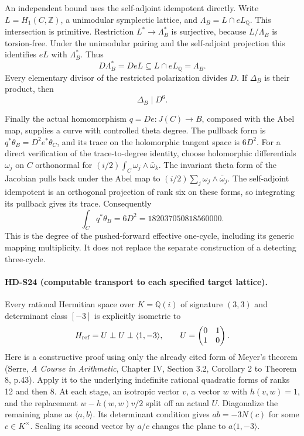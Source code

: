 An independent bound uses the self-adjoint idempotent directly. Write
\(L=H_1(C,\mathbb Z)\), a unimodular symplectic lattice, and
\(\Lambda_B=L\cap eL_{\mathbb Q}\). This intersection is primitive.
Restriction \(L^*\to\Lambda_B^*\) is surjective, because
\(L/\Lambda_B\) is torsion-free. Under the unimodular pairing and
the self-adjoint projection this identifies \(eL\) with
\(\Lambda_B^*\). Thus
\[
 D\Lambda_B^*=DeL\subseteq L\cap eL_{\mathbb Q}=\Lambda_B.
\]
Every elementary divisor of the restricted polarization divides \(D\).
If \(\Delta_B\) is their product, then
\begin{equation}\label{eq:e8-source-product-bound}
 \Delta_B\mid D^6.
\end{equation}

Finally the actual homomorphism \(q=De:J(C)\to B\), composed with
the Abel map, supplies a curve with controlled theta degree.
The pullback form is \(q^*\theta_B=D^2e^*\theta_C\), and its trace
on the holomorphic tangent space is \(6D^2\).
For a direct verification of the trace-to-degree identity, choose
holomorphic differentials \(\omega_j\) on \(C\) orthonormal for
\((i/2)\int_C\omega_j\wedge\bar\omega_k\). The invariant theta
form of the Jacobian pulls back under the Abel map to
\((i/2)\sum_j\omega_j\wedge\bar\omega_j\). The self-adjoint
idempotent is an orthogonal projection of rank six on these forms,
so integrating its pullback gives its trace. Consequently
\begin{equation}\label{eq:e8-abel-degree}
 \int_C q^*\theta_B=6D^2=182037050818560000.
\end{equation}
This is the degree of the pushed-forward effective one-cycle, including
its generic mapping multiplicity. It does not replace the separate
construction of a detecting three-cycle.

\paragraph{HD-S24 (computable transport to each specified target lattice).}
Every rational Hermitian space over \(K=\mathbb Q(i)\) of signature
\((3,3)\) and determinant class \([-3]\) is explicitly isometric to
\[
 H_{\rm ref}=U\perp U\perp\langle1,-3\rangle,
 \qquad U=\begin{pmatrix}0&1\\1&0\end{pmatrix}.
\]
Here is a constructive proof using only the already cited form of
Meyer's theorem (Serre, \emph{A Course in Arithmetic}, Chapter IV,
Section 3.2, Corollary 2 to Theorem 8, p.43). Apply it to the underlying
indefinite rational quadratic forms of ranks 12 and then 8. At each
stage, an isotropic vector \(v\), a vector \(w\) with \(h(v,w)=1\),
and the replacement \(w-h(w,w)v/2\) split off an actual \(U\).
Diagonalize the remaining plane as \(\langle a,b\rangle\).
Its determinant condition gives \(ab=-3N(c)\) for some \(c\in K^\times\).
Scaling its second vector by \(a/c\) changes the plane to
\(a\langle1,-3\rangle\).

